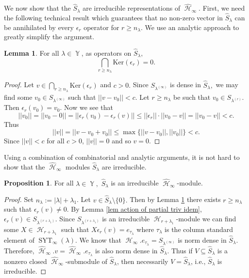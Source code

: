 \documentclass[12pt,reqno]{amsart}
\theoremstyle{definition}
\newtheorem{lem}[thm]{Lemma}
\newtheorem{prop}[thm]{Proposition}
\DeclareMathOperator{\cH}{\mathcal{H}}
\DeclareMathOperator{\SYT}{\mathrm{SYT}}
\DeclareMathOperator{\Par}{\mathbb{Y}}
\begin{document}
We now show that the $\hat{S}_{\lambda}$ are irreducible representations of $\widehat{\cH}_{\infty}.$ First, we need the following technical result which guarantees that no non-zero vector in $\hat{S}_{\lambda}$ can be annihilated by every $\epsilon_r$ operator for $r \geq n_{\lambda}.$ We use an analytic approach to greatly simplify the argument.

\begin{lem}\label{lem intersection of ker 0}
   For all $\lambda \in \Par$, as operators on $\hat{S}_{\lambda},$
   $$\bigcap_{r \geq n_{\lambda}} \mathrm{Ker} (\epsilon_r) = 0.$$
\end{lem}
\begin{proof}
    Let $v \in \bigcap_{r \geq n_{\lambda}} \mathrm{Ker} (\epsilon_r)$ and $c>0.$ Since $S_{\lambda^{(\infty)}}$ is dense in $\hat{S}_{\lambda},$ we may find some $v_0 \in S_{\lambda^{(\infty)}}$ such that $||v-v_0|| < c.$ Let $r \geq n_{\lambda}$ be such that $v_0 \in S_{\lambda^{(r)}}$. Then $\epsilon_r(v_0) = v_0.$ Now we see that 
    $$||v_0|| = ||v_0-0|| = ||\epsilon_r(v_0) - \epsilon_r(v)|| \leq ||\epsilon_r||\cdot ||v_0-v|| = ||v_0-v|| < c.$$ Thus 
    $$||v|| = ||v-v_0 + v_0|| \leq \max\{ ||v-v_0||, ||v_0|| \} < c.$$ Since $||v||< c$ for all $c > 0$, $||v|| = 0$ and so $v=0.$
\end{proof}

Using a combination of combinatorial and analytic arguments, it is not hard to show that the $\widehat{\cH}_{\infty}$ modules $\hat{S}_{\lambda}$ are irreducible.

\begin{prop}\label{prop inf specht are irred}
    For all $\lambda \in \Par,$ $\hat{S}_{\lambda}$ is an irreducible $\widehat{\cH}_{\infty}$-module.
\end{prop}
\begin{proof}
   Set $n_{\lambda}:= |\lambda| + \lambda_1$. Let $v \in \hat{S}_{\lambda} \setminus \{0\}.$ Then by Lemma \ref{lem intersection of ker 0} there exists $r \geq n_{\lambda}$ such that $\epsilon_r(v) \neq 0.$ By Lemma \ref{lem action of partial triv idem}, $\epsilon_r(v) \in S_{\lambda^{(r+\lambda_1)}}.$  Since $S_{\lambda^{(r+\lambda_1)}}$ is an irreducible $\cH_{r+\lambda_1}$-module we can find some $X \in \cH_{r+\lambda_1}$ such that $X \epsilon_r(v) = e_{\tau_{\lambda}}$ where $\tau_{\lambda}$ is the column standard element of $\SYT_{\infty}(\lambda).$ We know that $\cH_{\infty}.e_{\tau_{\lambda}} = S_{\lambda^{(\infty)}}$ is norm dense in $\hat{S}_{\lambda}.$ Therefore, $\widehat{\cH}_{\infty}.v = \widehat{\cH}_{\infty}.e_{\tau_{\lambda}}$ is also norm dense in $\hat{S}_{\lambda}.$ Thus if $V \subseteq \hat{S}_{\lambda}$ is a nonzero closed $\widehat{\cH}_{\infty}$-submodule of $\hat{S}_{\lambda}$, then necessarily $V = \hat{S}_{\lambda}$, i.e., $\hat{S}_{\lambda}$ is irreducible.
\end{proof}
\end{document}

